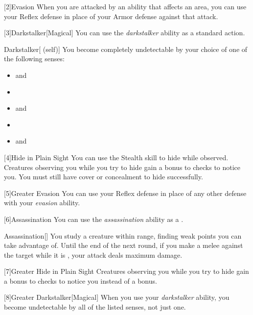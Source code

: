         [2]{Evasion} When you are attacked by an ability that affects an area, you can use your Reflex defense in place of your Armor defense against that attack.

        [3]{Darkstalker}[Magical] You can use the \textit{darkstalker} ability as a standard action.
        \begin{attuneability}{Darkstalker}[ (self)]
            You become completely undetectable by your choice of one of the following senses:
            \begin{itemize}
                \item {} and 
                \item {}
                \item {} and 
                \item {}
                \item {} and 
            \end{itemize}
        \end{attuneability}

        [4]{Hide in Plain Sight} You can use the Stealth skill to hide while observed.
        Creatures observing you while you try to hide gain a  bonus to checks to notice you.
        You must still have cover or concealment to hide successfully.

        [5]{Greater Evasion} You can use your Reflex defense in place of any other defense with your \textit{evasion} ability.

        [6]{Assassination} You can use the \textit{assassination} ability as a .
        \begin{freeability}{Assassination}[]
            You study a creature within \rngmed range, finding weak points you can take advantage of.
            Until the end of the next round, if you make a melee  against the target while it is \unaware, your attack deals maximum damage.
        \end{freeability}

        [7]{Greater Hide in Plain Sight} Creatures observing you while you try to hide gain a  bonus to checks to notice you instead of a  bonus.

        [8]{Greater Darkstalker}[Magical] When you use your \textit{darkstalker} ability, you become undetectable by all of the listed senses, not just one.

